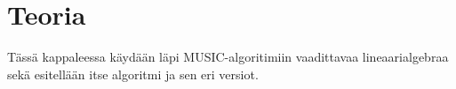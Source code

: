 \section{Teoria}
Tässä kappaleessa käydään läpi MUSIC-algoritimiin vaadittavaa lineaarialgebraa sekä esitellään itse algoritmi ja sen eri versiot.



\clearpage


\clearpage


\clearpage
